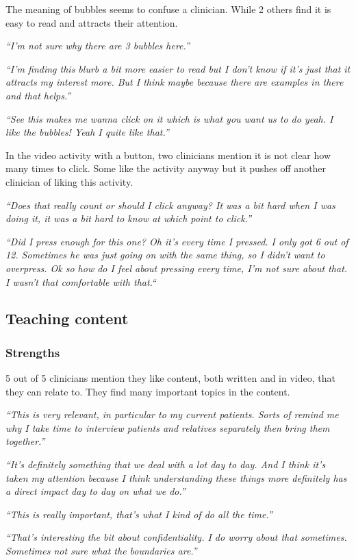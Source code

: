 \documentclass{sigchi}
\begin{document}
The meaning of bubbles seems to confuse a clinician. While 2 others find it is easy to read and attracts their attention.

\textit{“I’m not sure why there are 3 bubbles here.”}

\textit{“I’m finding this blurb a bit more easier to read but I don’t know if it’s just that it attracts my interest more. But I think maybe because there are examples in there and that helps.”}

\textit{“See this makes me wanna click on it which is what you want us to do yeah. I like the bubbles! Yeah I quite like that.”}

In the video activity with a button, two clinicians mention it is not clear how many times to click. Some like the activity anyway but it pushes off another clinician of liking this activity.

\textit{“Does that really count or should I click anyway? It was a bit hard when I was doing it, it was a bit hard to know at which point to click.”}

\textit{“Did I press enough for this one? Oh it’s every time I pressed. I only got 6 out of 12. Sometimes he was just going on with the same thing, so I didn’t want to overpress. Ok so how do I feel about pressing every time, I’m not sure about that. I wasn’t that comfortable with that.“}

\subsection{Teaching content}
\subsubsection{Strengths}
5 out of 5 clinicians mention they like content, both written and in video, that they can relate to. They find many important topics in the content. 

\textit{“This is very relevant, in particular to my current patients. Sorts of remind me why I take time to interview patients and relatives separately then bring them together.”}

\textit{“It's definitely something that we deal with a lot day to day. And I think it’s taken my attention because I think understanding these things more definitely has a direct impact day to day on what we do.”}

\textit{“This is really important, that’s what I kind of do all the time.”}

\textit{“That’s interesting the bit about confidentiality. I do worry about that sometimes. Sometimes not sure what the boundaries are.”}
\end{document}
